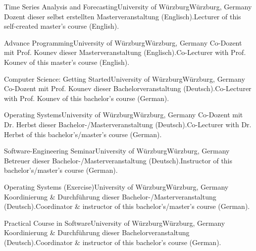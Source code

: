 
\begin{cventries}

    {Time Series Analysis and Forecasting}{University of Würzburg}{Würzburg, Germany}%
    {} %
    {Dozent dieser selbst erstellten Masterveranstaltung (Englisch).}{Lecturer of this self-created master's course (English).}

    {Advance Programming}{University of Würzburg}{Würzburg, Germany}%
    {} %
    {Co-Dozent mit Prof. Kounev dieser Masterveranstaltung (Englisch).}{Co-Lecturer with Prof. Kounev of this master's course (English).}

    {Computer Science: Getting Started}{University of Würzburg}{Würzburg, Germany}%
    {} %
    {Co-Dozent mit Prof. Kounev dieser Bachelorveranstaltung (Deutsch).}{Co-Lecturer with Prof. Kounev of this bachelor's course (German).}

    {Operating Systems}{University of Würzburg}{Würzburg, Germany}%
    {} %
    {Co-Dozent mit Dr. Herbst dieser Bachelor-/Masterveranstaltung (Deutsch).}{Co-Lecturer with Dr. Herbst of this bachelor's/master's course (German).}

    {Software-Engineering Seminar}{University of Würzburg}{Würzburg, Germany}%
    {} %
    {Betreuer dieser Bachelor-/Masterveranstaltung (Deutsch).}{Instructor of this bachelor's/master's course (German).}

    {Operating Systems (Exercise)}{University of Würzburg}{Würzburg, Germany}%
    {} %
    {Koordinierung \& Durchführung dieser Bachelor-/Masterveranstaltung (Deutsch).}{Coordinator \& instructor of this bachelor's/master's course (German).}

    {Practical Course in Software}{University of Würzburg}{Würzburg, Germany}%
    {} %
    {Koordinierung \& Durchführung dieser Bachelorveranstaltung (Deutsch).}{Coordinator \& instructor of this bachelor's course (German).}

\end{cventries}